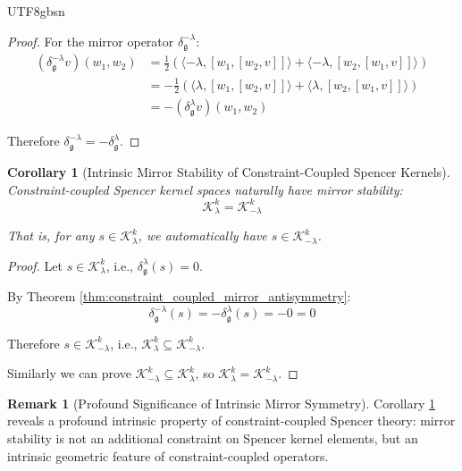 \documentclass[a4paper,12pt]{extarticle}
\newtheorem{corollary}[theorem]{Corollary}
\theoremstyle{definition}
\newtheorem{remark}{Remark}[section]
\begin{document}
\begin{CJK}{UTF8}{gbsn}
\begin{proof}
For the mirror operator $\delta^{-\lambda}_\mathfrak{g}$:
\begin{align}
(\delta^{-\lambda}_\mathfrak{g}v)(w_1, w_2) &= \frac{1}{2}\left(\langle -\lambda, [w_1, [w_2, v]]\rangle + \langle -\lambda, [w_2, [w_1, v]]\rangle\right) \label{eq:mirror_operator_1}\\
&= -\frac{1}{2}\left(\langle \lambda, [w_1, [w_2, v]]\rangle + \langle \lambda, [w_2, [w_1, v]]\rangle\right) \label{eq:mirror_operator_2}\\
&= -(\delta^\lambda_\mathfrak{g}v)(w_1, w_2) \label{eq:mirror_operator_3}
\end{align}

Therefore $\delta^{-\lambda}_\mathfrak{g} = -\delta^\lambda_\mathfrak{g}$.
\end{proof}

\begin{corollary}[Intrinsic Mirror Stability of Constraint-Coupled Spencer Kernels]
\label{cor:intrinsic_mirror_stability}
Constraint-coupled Spencer kernel spaces naturally have mirror stability:
\begin{equation}
\label{eq:kernel_mirror_stability}
\mathcal{K}^k_\lambda = \mathcal{K}^k_{-\lambda}
\end{equation}

That is, for any $s \in \mathcal{K}^k_\lambda$, we automatically have $s \in \mathcal{K}^k_{-\lambda}$.
\end{corollary}

\begin{proof}
Let $s \in \mathcal{K}^k_\lambda$, i.e., $\delta^\lambda_\mathfrak{g}(s) = 0$.

By Theorem \ref{thm:constraint_coupled_mirror_antisymmetry}:
\begin{equation}
\label{eq:mirror_kernel_proof}
\delta^{-\lambda}_\mathfrak{g}(s) = -\delta^\lambda_\mathfrak{g}(s) = -0 = 0
\end{equation}

Therefore $s \in \mathcal{K}^k_{-\lambda}$, i.e., $\mathcal{K}^k_\lambda \subseteq \mathcal{K}^k_{-\lambda}$.

Similarly we can prove $\mathcal{K}^k_{-\lambda} \subseteq \mathcal{K}^k_\lambda$, so $\mathcal{K}^k_\lambda = \mathcal{K}^k_{-\lambda}$.
\end{proof}

\begin{remark}[Profound Significance of Intrinsic Mirror Symmetry]
Corollary \ref{cor:intrinsic_mirror_stability} reveals a profound intrinsic property of constraint-coupled Spencer theory: mirror stability is not an additional constraint on Spencer kernel elements, but an intrinsic geometric feature of constraint-coupled operators.


\end{remark}
\end{CJK}
\end{document}
